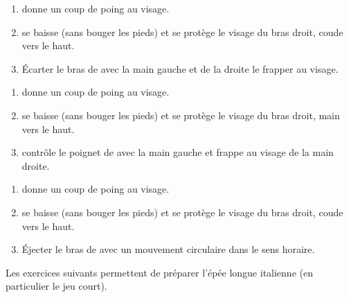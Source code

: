 \begin{exercice}
\label{mains-nues:ex:enzi-2}

\begin{enumerate}
	\item \A donne un coup de poing au visage.
	\item \D se baisse (sans bouger les pieds) et se protège le visage du bras droit, coude vers le haut.
	\item Écarter le bras de \A avec la main gauche et de la droite le frapper au visage.
\end{enumerate}

\end{exercice}


\begin{exercice}
\label{mains-nues:ex:enzi-3}

\begin{enumerate}
	\item \A donne un coup de poing au visage.
	\item \D se baisse (sans bouger les pieds) et se protège le visage du bras droit, main vers le haut.
	\item \D contrôle le poignet de \A avec la main gauche et frappe au visage de la main droite.
\end{enumerate}

\end{exercice}


\begin{exercice}
\label{mains-nues:ex:enzi-4}

\begin{enumerate}
	\item \A donne un coup de poing au visage.
	\item \D se baisse (sans bouger les pieds) et se protège le visage du bras droit, coude vers le haut.
	\item Éjecter le bras de \A avec un mouvement circulaire dans le sens horaire.
\end{enumerate}

\end{exercice}
\bigskip

Les exercices suivants permettent de préparer l'épée longue italienne (en particulier le jeu court).


